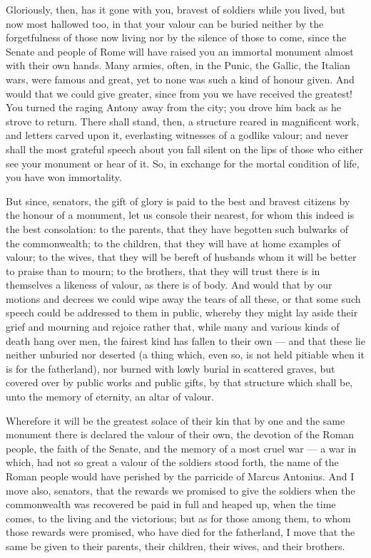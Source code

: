  Gloriously, then, has it gone with you, bravest of soldiers while you lived, but now most hallowed too, in that your valour can be buried neither by the forgetfulness of those now living nor by the silence of those to come, since the Senate and people of Rome will have raised you an immortal monument almost with their own hands. Many armies, often, in the Punic, the Gallic, the Italian wars, were famous and great, yet to none was such a kind of honour given. And would that we could give greater, since from you we have received the greatest! You turned the raging Antony away from the city; you drove him back as he strove to return. There shall stand, then, a structure reared in magnificent work, and letters carved upon it, everlasting witnesses of a godlike valour; and never shall the most grateful speech about you fall silent on the lips of those who either see your monument or hear of it. So, in exchange for the mortal condition of life, you have won immortality.

 But since, senators, the gift of glory is paid to the best and bravest citizens by the honour of a monument, let us console their nearest, for whom this indeed is the best consolation: to the parents, that they have begotten such bulwarks of the commonwealth; to the children, that they will have at home examples of valour; to the wives, that they will be bereft of husbands whom it will be better to praise than to mourn; to the brothers, that they will trust there is in themselves a likeness of valour, as there is of body. And would that by our motions and decrees we could wipe away the tears of all these, or that some such speech could be addressed to them in public, whereby they might lay aside their grief and mourning and rejoice rather that, while many and various kinds of death hang over men, the fairest kind has fallen to their own --- and that these lie neither unburied nor deserted (a thing which, even so, is not held pitiable when it is for the fatherland), nor burned with lowly burial in scattered graves, but covered over by public works and public gifts, by that structure which shall be, unto the memory of eternity, an altar of valour.

 Wherefore it will be the greatest solace of their kin that by one and the same monument there is declared the valour of their own, the devotion of the Roman people, the faith of the Senate, and the memory of a most cruel war --- a war in which, had not so great a valour of the soldiers stood forth, the name of the Roman people would have perished by the parricide of Marcus Antonius. And I move also, senators, that the rewards we promised to give the soldiers when the commonwealth was recovered be paid in full and heaped up, when the time comes, to the living and the victorious; but as for those among them, to whom those rewards were promised, who have died for the fatherland, I move that the same be given to their parents, their children, their wives, and their brothers.

